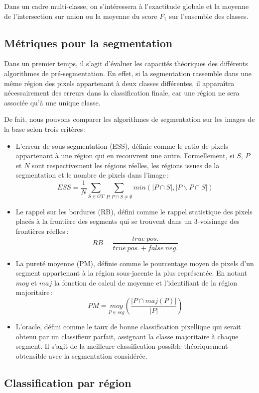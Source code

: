 Dans un cadre multi-classe, on s'intéressera à l'exactitude globale et la moyenne de l'intersection sur union ou la moyenne du score $F_1$ sur l'ensemble des classes.

\subsection{Métriques pour la segmentation}

Dans un premier temps, il s'agit d'évaluer les capacités théoriques des différents algorithmes de pré-segmentation. En effet, si la segmentation rassemble dans une même région des pixels appartenant à deux classes différentes, il apparaîtra nécessairement des erreurs dans la classification finale, car une région ne sera associée qu'à une unique classe.

De fait, nous pouvons comparer les algorithmes de segmentation sur les images de la base selon trois critères\,:
\begin{itemize}
  \item L'erreur de sous-segmentation (ESS), définie comme le ratio de pixels appartenant à une région qui en recouvrent une autre. Formellement, si $S$, $P$ et $N$ sont respectivement les régions réelles, les régions issues de la segmentation et le nombre de pixels dans l'image\,:
  $$ESS = \frac{1}{N} \sum_{S \in GT} \sum_{P : P \cap S \neq \emptyset} min(|P \cap S|, |P \backslash P \cap S|)$$
  \item Le rappel sur les bordures (RB), défini comme le rappel statistique des pixels placés à la frontière des segments qui se trouvent dans un 3-voisinage des frontières réelles\,:
  $$RB =  \frac{true\ pos.}{true\ pos. + false\ neg.}$$
  \item La pureté moyenne (PM), définie comme le pourcentage moyen de pixels d'un segment appartenant à la région sous-jacente la plus représentée. En notant $moy$ et $maj$ la fonction de calcul de moyenne et l'identifiant de la région majoritaire\,:
  $$PM = \underset{P \in seg}{moy} \left(\frac{| P \cap maj(P)|}{| P |}\right)$$
  \item L'oracle, défini comme le taux de bonne classification pixellique qui serait obtenu par un classifieur parfait, assignant la classe majoritaire à chaque segment. Il s'agit de la meilleure classification possible théoriquement obtensible avec la segmentation considérée.
\end{itemize}

\subsection{Classification par région}
\label{sec:results_region}


